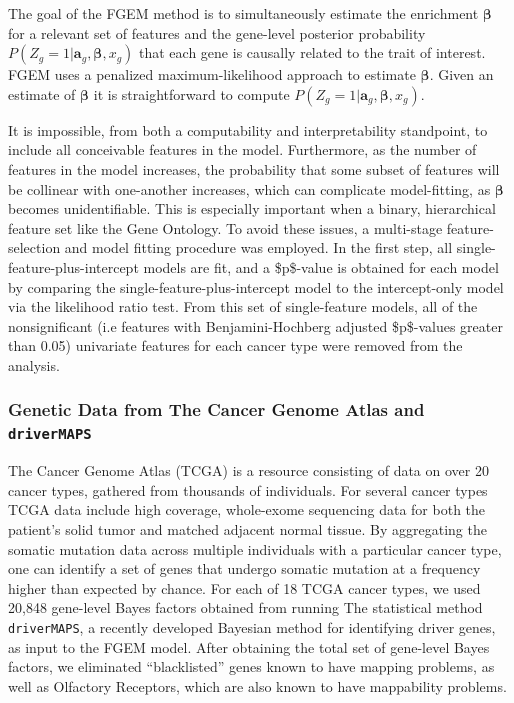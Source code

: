 The goal of the FGEM method is to simultaneously estimate the enrichment $\boldsymbol{\beta}$ for a relevant set of features and the gene-level posterior probability \(P(Z_g=1|\textbf{a}_g,\boldsymbol{\beta},x_g)\) that each
gene is causally related to the trait of interest.  FGEM uses a penalized maximum-likelihood approach to estimate $\boldsymbol{\beta}$.  Given an estimate of $\boldsymbol{\beta}$ it is straightforward to compute
\(P(Z_g=1|\textbf{a}_g,\boldsymbol{\beta},x_g)\).

It is impossible, from both a computability and interpretability standpoint, to include all conceivable features in the model.
Furthermore, as the number of features in the model increases, the probability that some subset of features will be collinear with one-another increases,
which can complicate model-fitting, as \(\boldsymbol{\beta}\) becomes unidentifiable. This is especially important when a binary, hierarchical feature set
like the Gene Ontology.  To avoid these issues, a multi-stage feature-selection and model fitting procedure was employed. In the first step, all
single-feature-plus-intercept models are fit, and a \$p\$-value is obtained for each model by comparing the single-feature-plus-intercept model to the intercept-only model via the
likelihood ratio test.  From this set of single-feature models, all of the nonsignificant (i.e features with Benjamini-Hochberg adjusted
\$p\$-values greater than 0.05) univariate features for each cancer type were removed from the analysis.


\subsubsection{Genetic Data from The Cancer Genome Atlas and \texttt{driverMAPS}}\label{sec:org31ff9f1}

The Cancer Genome Atlas (TCGA) is a resource consisting of data on over 20 cancer types, gathered from thousands of individuals\cite{TCGA}.  For several cancer types TCGA data include high coverage, whole-exome sequencing data for both the patient's solid tumor and matched adjacent normal tissue. By aggregating the somatic mutation data across multiple individuals with a particular cancer type, one can identify a set of genes that undergo somatic mutation at a frequency higher than expected by chance.  For each of 18 TCGA cancer types, we used 20,848 gene-level Bayes factors obtained from running The statistical method \texttt{driverMAPS}, a recently developed Bayesian method for identifying driver genes, as input to the FGEM model.  After obtaining the total set of gene-level Bayes factors, we eliminated ``blacklisted'' genes known to have mapping problems\cite{drivermapsblacklist}, as well as Olfactory Receptors, which are also known to have mappability problems\cite{Derrien_2012}.

